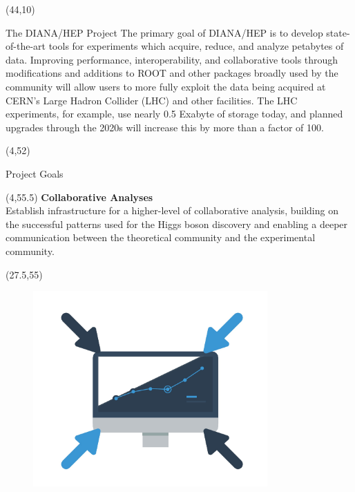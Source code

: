 \documentclass[final]{beamer}
\begin{document}
\begin{frame}{}
\begin{textblock}{38.0}(44,10)
\begin{block}{The DIANA/HEP Project}
The primary goal of DIANA/HEP is to develop state-of-the-art tools
for experiments which acquire, reduce, and analyze petabytes of
data. Improving performance, interoperability, and collaborative
tools through modifications and additions to ROOT and other packages
broadly used by the community will allow users to more fully exploit
the data being acquired at CERN's Large Hadron Collider (LHC) and
other facilities. The LHC experiments, for example, use nearly 0.5 Exabyte of
storage today, and planned upgrades through the 2020s will increase this
by more than a factor of 100. 
\end{block}
\end{textblock}

\begin{textblock}{78.0}(4,52)
\begin{block}{Project Goals}
\end{block}
\end{textblock}

\begin{textblock}{22.5}(4,55.5)
\textcolor{mybluelabel}{\bf Collaborative Analyses} \\
Establish infrastructure for a higher-level of collaborative analysis, building on the successful patterns used for the Higgs boson discovery and enabling a deeper communication between the theoretical community and the experimental community. 
\end{textblock}

\begin{textblock}{12.5}(27.5,55)
\begin{figure}[tbph]
\centering
\includegraphics[width=0.8\textwidth]{collaborate.jpg}
\end{figure}
\end{textblock}


\end{frame}
\end{document}
